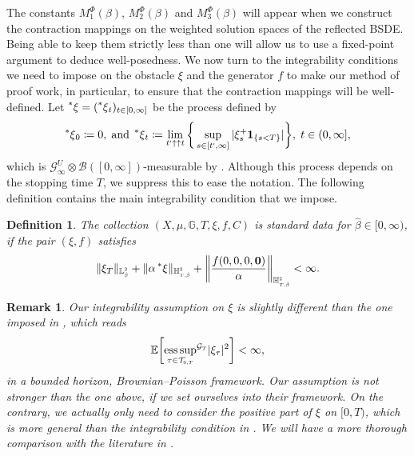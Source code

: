 \documentclass[10pt]{article} %
\newtheorem{definition}[theorem]{Definition}
\newtheorem{remark}[theorem]{Remark}
\newcommand\cB{\mathcal B}
\newcommand\cG{\mathcal G}
\newcommand\cT{\mathcal T}
\newcommand{\smalltext}[1]{\text{\fontsize{4}{4}\selectfont$#1$}}
\def \E{\mathbb{E}}
\def \G{\mathbb{G}}
\def \H{\mathbb{H}}
\def \L{\mathbb{L}}
\newcommand{\brs}[1]{\prescript{\ast}{}{#1}}
\DeclareMathOperator*{\esssup}{ess\,sup}
\begin{document}
The constants $M^\Phi_1(\beta)$, $M^\Phi_2(\beta)$ and $M^\Phi_3(\beta)$ will appear when we construct the contraction mappings on the weighted solution spaces of the reflected BSDE. Being able to keep them strictly less than one will allow us to use a fixed-point argument to deduce well-posedness. We now turn to the integrability conditions we need to impose on the obstacle $\xi$ and the generator $f$ to make our method of proof work, in particular, to ensure that the contraction mappings will be well-defined. Let $\brs{\xi} = (\brs{\xi}_t)_{t \in [0,\infty]}$ be the process defined by
\begin{equation}\label{eq::left_limit_xi}
	\brs{\xi}_0 \coloneqq 0, \; \text{and} \; \brs{\xi}_t \coloneqq \lim_{t^{\smalltext{\prime}} \uparrow\uparrow t}\bigg\{\sup_{s \in [t^\smalltext{\prime},\infty]} |\xi^+_s \mathbf{1}_{\{s < T\}}|\bigg\}, \; t \in (0,\infty],
\end{equation}
which is $\cG^U_\infty \otimes \cB([0,\infty])$-measurable by \cite[Proposition 2.21]{karoui2013capacities}. Although this process depends on the stopping time $T$, we suppress this to ease the notation. The following definition contains the main integrability condition that we impose.
\begin{definition}\label{def::standard_data}
The collection $(X,\mu,\G,T,\xi,f,C)$ is \emph{standard data for $\hat\beta \in [0,\infty)$}, if the pair $(\xi,f)$ satisfies
\begin{equation*}
		\|\xi_T\|_{\L^\smalltext{2}_\smalltext{\hat\beta}} + \|\alpha \brs{\xi}\|_{\H^\smalltext{2}_{\smalltext{T}\smalltext{,}\smalltext{\hat\beta}}} + \bigg\|\frac{f(0,0,0,\mathbf{0})}{\alpha}\bigg\|_{\H^\smalltext{2}_{\smalltext{T}\smalltext{,}\smalltext{\hat\beta}}}  < \infty.
	\end{equation*}
\end{definition}

\begin{remark}
	Our integrability assumption on $\xi$ is slightly different than the one imposed in {\rm\cite{grigorova2017reflected,grigorova2020optimal}}, which reads
		\begin{equation*}
		\E\bigg[{\esssup_{\tau \in \cT_{\smalltext{0}\smalltext{,}\smalltext{T}}}}^{\cG_\smalltext{T}} |\xi_\tau|^2\bigg] < \infty,
	\end{equation*}
	in a bounded horizon, Brownian--Poisson framework. Our assumption is not stronger than the one above, if we set ourselves into their framework. On the contrary, we actually only need to consider the positive part of $\xi$ on $[0,T)$, which is more general than the integrability condition in {\rm\cite{grigorova2017reflected,grigorova2020optimal}}. We will have a more thorough comparison with the literature in {\rm{}}.
\end{remark}
\end{document}
